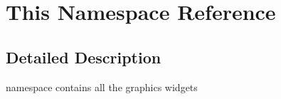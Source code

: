 \hypertarget{namespaceThis}{
\section{This Namespace Reference}
\label{namespaceThis}
}




\subsection{Detailed Description}
namespace contains all the graphics widgets 